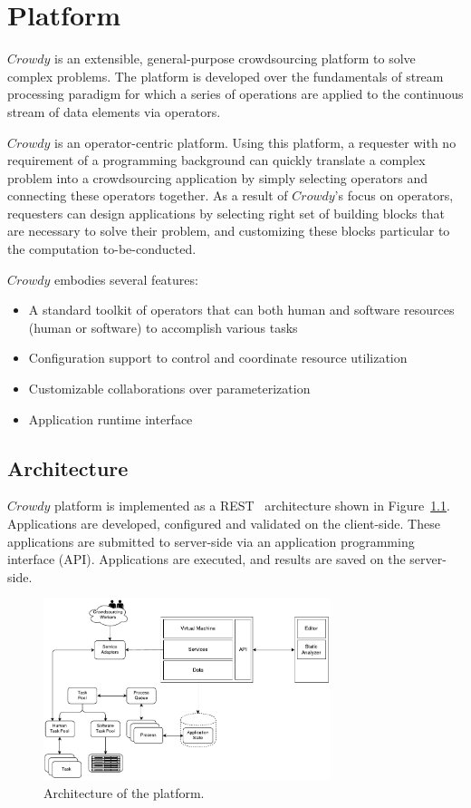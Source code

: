 \chapter{Platform}
\label{chap:platform}

$Crowdy$ is an extensible, general-purpose crowdsourcing platform to solve 
complex problems. The platform is developed over the fundamentals of stream 
processing paradigm for which a series of operations are applied to the continuous 
stream of data elements via operators.

$Crowdy$ is an operator-centric platform. Using this platform, a requester with no 
requirement of a programming background can quickly translate a complex problem into 
a crowdsourcing application by simply selecting operators and connecting these operators 
together. As a result of $Crowdy$'s focus on operators, requesters can design applications 
by selecting right set of building blocks that are necessary to solve their problem, 
and customizing these blocks particular to the computation to-be-conducted.

$Crowdy$ embodies several features:
\begin{itemize}
	\item A standard toolkit of operators that can both human and software resources 
	(human or software) to accomplish various tasks
	\item Configuration support to control and coordinate resource utilization 
	\item Customizable collaborations over parameterization
	\item Application runtime interface
\end{itemize}

\section{Architecture}

$Crowdy$ platform is implemented as a REST~\cite{Richardson2008} architecture 
shown in Figure~\ref{fig:architecture}. Applications are developed, configured and 
validated on the client-side. These applications are submitted to server-side via an 
application programming interface (API). Applications are executed, and results 
are saved on the server-side.

\begin{figure}[ht]
	\centering
	\includegraphics[height=200px]{figures/Architecture.pdf}
	\caption{Architecture of the platform.}
	\label{fig:architecture}
\end{figure}

